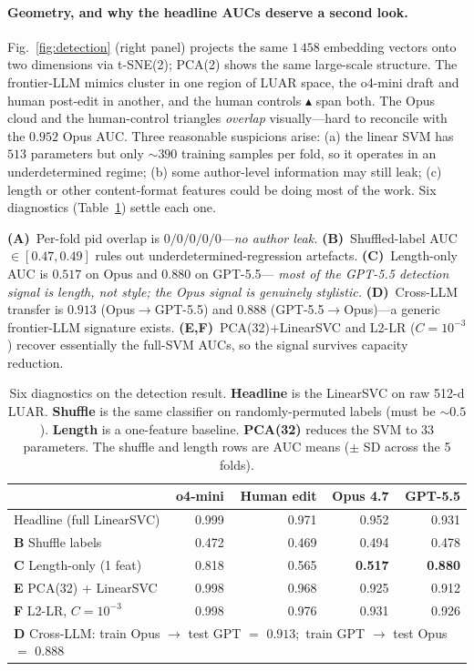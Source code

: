 \documentclass[runningheads]{llncs}
\begin{document}
\paragraph{Geometry, and why the headline AUCs deserve a second look.}
Fig.~\ref{fig:detection} (right panel) projects the same $1\,458$
embedding vectors onto two dimensions via t-SNE(2); PCA(2) shows
the same large-scale structure. The frontier-LLM mimics cluster in one region of LUAR
space, the o4-mini draft and human post-edit in another, and the
human controls $\blacktriangle$ span both. The Opus cloud and the
human-control triangles \emph{overlap} visually---hard to reconcile
with the $0.952$ Opus AUC. Three reasonable suspicions arise: (a) the linear SVM has
$513$ parameters but only $\sim$$390$ training samples per fold, so it
operates in an underdetermined regime; (b) some author-level
information may still leak; (c) length or other content-format
features could be doing most of the work. Six diagnostics
(Table~\ref{tab:detection-diag}) settle each one.

\textbf{(A)}~Per-fold pid overlap is $0/0/0/0/0$---\emph{no author
leak.} \textbf{(B)}~Shuffled-label AUC $\in [0.47, 0.49]$ rules
out underdetermined-regression artefacts. \textbf{(C)}~Length-only
AUC is $\mathbf{0.517}$ on Opus and $\mathbf{0.880}$ on GPT-5.5---
\emph{most of the GPT-5.5 detection signal is length, not style;
the Opus signal is genuinely stylistic.}
\textbf{(D)}~Cross-LLM transfer is $0.913$ (Opus$\to$GPT-5.5) and
$0.888$ (GPT-5.5$\to$Opus)---a generic frontier-LLM signature
exists. \textbf{(E,F)}~PCA(32)$+$LinearSVC and L2-LR
($C{=}10^{-3}$) recover essentially the full-SVM AUCs, so the
signal survives capacity reduction.

\begin{table}[t]
\centering
\caption{Six diagnostics on the detection result. \textbf{Headline}
is the LinearSVC on raw 512-d LUAR. \textbf{Shuffle} is the same
classifier on randomly-permuted labels (must be $\sim$$0.5$).
\textbf{Length} is a one-feature baseline. \textbf{PCA(32)} reduces
the SVM to 33 parameters. The shuffle and length rows are AUC means
($\pm$ SD across the 5 folds).}
\label{tab:detection-diag}
\begin{tabular}{l@{\quad} r r r r}
\toprule
& o4-mini & Human edit & Opus 4.7 & GPT-5.5 \\
\midrule
Headline (full LinearSVC) & 0.999 & 0.971 & 0.952 & 0.931 \\
\textbf{B} Shuffle labels       & 0.472 & 0.469 & 0.494 & 0.478 \\
\textbf{C} Length-only (1 feat) & 0.818 & 0.565 & \textbf{0.517} & \textbf{0.880} \\
\textbf{E} PCA(32) + LinearSVC  & 0.998 & 0.968 & 0.925 & 0.912 \\
\textbf{F} L2-LR, $C{=}10^{-3}$ & 0.998 & 0.976 & 0.931 & 0.926 \\
\midrule
\multicolumn{5}{l}{\textbf{D} Cross-LLM: train Opus $\to$ test GPT $=$ $0.913$;\,
                   train GPT $\to$ test Opus $=$ $0.888$} \\
\bottomrule
\end{tabular}
\end{table}
\end{document}
